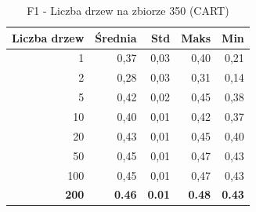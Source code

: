 \begin{table}[htbp]
\centering
\small
\setlength{\tabcolsep}{6pt}
\renewcommand{\arraystretch}{1.2}
\caption{F1 - Liczba drzew na zbiorze 350 (CART)}
\label{tab:CART_tree_count_350_f1}
\begin{tabular}{r|r|r|r|r}
\toprule
Liczba drzew & Średnia & Std & Maks & Min \\
\hline
1 & 0,37 & 0,03 & 0,40 & 0,21 \\
2 & 0,28 & 0,03 & 0,31 & 0,14 \\
5 & 0,42 & 0,02 & 0,45 & 0,38 \\
10 & 0,40 & 0,01 & 0,42 & 0,37 \\
20 & 0,43 & 0,01 & 0,45 & 0,40 \\
50 & 0,45 & 0,01 & 0,47 & 0,43 \\
100 & 0,45 & 0,01 & 0,47 & 0,43 \\
\textbf{200} & \textbf{0.46} & \textbf{0.01} & \textbf{0.48} & \textbf{0.43} \\
\bottomrule
\end{tabular}
\end{table}